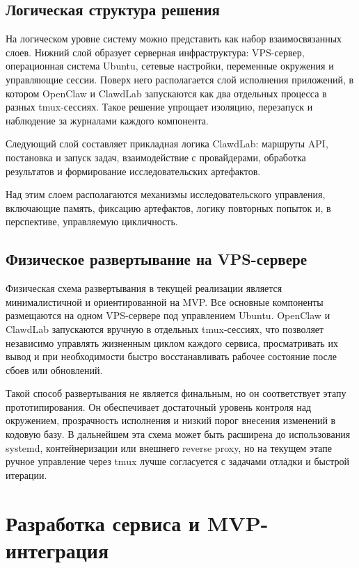 \subsection{Логическая структура решения}

На логическом уровне систему можно представить как набор взаимосвязанных слоев. Нижний слой образует серверная инфраструктура: VPS-сервер, операционная система Ubuntu, сетевые настройки, переменные окружения и управляющие сессии. Поверх него располагается слой исполнения приложений, в котором OpenClaw и ClawdLab запускаются как два отдельных процесса в разных tmux-сессиях. Такое решение упрощает изоляцию, перезапуск и наблюдение за журналами каждого компонента.

Следующий слой составляет прикладная логика ClawdLab: маршруты API, постановка и запуск задач, взаимодействие с провайдерами, обработка результатов и формирование исследовательских артефактов.

Над этим слоем располагаются механизмы исследовательского управления, включающие память, фиксацию артефактов, логику повторных попыток и, в перспективе, управляемую цикличность. 

\subsection{Физическое развертывание на VPS-сервере}

Физическая схема развертывания в текущей реализации является минималистичной и ориентированной на MVP. Все основные компоненты размещаются на одном VPS-сервере под управлением Ubuntu. OpenClaw и ClawdLab запускаются вручную в отдельных tmux-сессиях, что позволяет независимо управлять жизненным циклом каждого сервиса, просматривать их вывод и при необходимости быстро восстанавливать рабочее состояние после сбоев или обновлений.

Такой способ развертывания не является финальным, но он соответствует этапу прототипирования. Он обеспечивает достаточный уровень контроля над окружением, прозрачность исполнения и низкий порог внесения изменений в кодовую базу. В дальнейшем эта схема может быть расширена до использования systemd, контейнеризации или внешнего reverse proxy, но на текущем этапе ручное управление через tmux лучше согласуется с задачами отладки и быстрой итерации.

\section{Разработка сервиса и MVP-интеграция}

